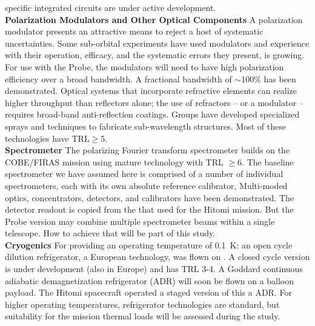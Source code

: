 specific integrated circuits are under active development.  \\
{\bf Polarization Modulators and Other Optical Components}  \hspace{0.1in} A polarization modulator presents 
an attractive means to reject a host of systematic uncertainties. Some sub-orbital experiments have used modulators 
and experience with their operation, efficacy, and the systematic errors they present, is growing. For use with the Probe,
the modulators will need to have high polarization efficiency over a broad bandwidth.  A fractional bandwidth of $\sim$100\%  
has been demonstrated. Optical systems that incorporate refractive elements can realize higher throughput 
than reflectors alone; the use of refractors -- or a modulator -- requires broad-band anti-reflection coatings. Groups 
have developed specialized sprays and techniques to fabricate sub-wavelength structures. Most of these 
technologies have TRL$\geq$5.  \\
{\bf Spectrometer} \hspace{0.1in} 
The polarizing Fourier transform spectrometer builds on the COBE/FIRAS mission using mature technology with TRL $\geq$6. 
The baseline spectrometer we have assumed here 
is comprised of a number of individual spectrometers, each with its own absolute reference calibrator, 
Multi-moded optics, concentrators, detectors, and calibrators have been demonstrated. The detector readout is copied from the 
that used for the Hitomi mission. But the Probe version may combine multiple spectrometer beams within a single telescope. 
How to achieve that will be part of this study. \\
{\bf Cryogenics }  \hspace{0.1in} For providing an operating temperature of 0.1~K: an open cycle dilution 
refrigerator, a European technology, was flown on \planck . 
A closed cycle version is under development (also in Europe) and has TRL 3-4. A Goddard continuous adiabatic 
demagnetization refrigerator (ADR) will soon be flown on a balloon payload.  The Hitomi spacecraft operated a 
staged version of this a ADR. For higher operating temperatures, refrigerator technologies are standard, but 
suitability for the mission thermal loads will be assessed during the study. 



